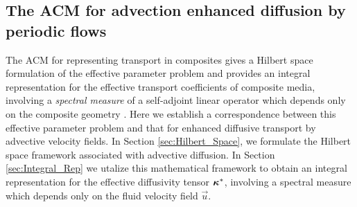 \documentclass[11pt]{amsart}
\newcommand\bkappa{\mbox{\boldmath${\kappa}$}}
\begin{document}
\subsection{The ACM for advection enhanced diffusion by periodic
  flows} \label{sec:ACM}   
%
The ACM for representing transport in composites gives a Hilbert space
formulation of the effective parameter problem and provides an
integral representation for the effective transport coefficients of
composite media, involving a \emph{spectral measure} of a self-adjoint
linear operator which depends only on the composite geometry
\cite{Golden:CMP-473,Murphy:JMP:063506,MILTON:2002:TC}. Here 
we establish a correspondence between this effective parameter problem
and that for enhanced diffusive transport by advective velocity
fields. In Section \ref{sec:Hilbert_Space}, we formulate the Hilbert
space framework associated with advective diffusion. In
Section \ref{sec:Integral_Rep} we utalize this mathematical framework
to obtain an integral representation for the effective diffusivity
tensor $\bkappa^*$, involving a spectral measure which depends only on
the fluid velocity field $\vec{u}$.  
\end{document}
